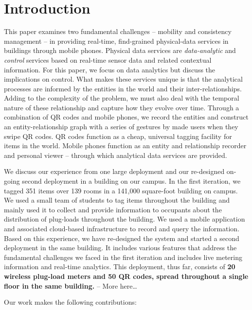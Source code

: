 \section{Introduction}

This paper examines two fundamental challenges -- mobility and consistency management -- in providing real-time, find-grained physical-data 
services in buildings through mobile phones.  Physical data services are \emph{data-analytic} and \emph{control} services 
based on real-time sensor data and related contextual information.  For this paper, we focus on data analytics but discuss the implications
on control.  What makes these services unique is that the analytical processes are informed by the entities in the world and
their inter-relationships.  Adding to the complexity of the problem, we must also deal with the temporal nature of these relationship
and capture how they evolve over time.
Through a combination of QR codes and mobile phones, we record
the entities and construct an entity-relationship graph with a series of gestures by made users when they swipe QR codes.
QR codes function as a cheap, universal tagging facility for items in the world.  Mobile phones function as an entity and relationship recorder and personal viewer -- through which analytical data services are provided.  

We discuss our experience from one large deployment and our re-designed on-going second deployment in a building on our campus.
In the first iteration, we tagged 351 items over 139 rooms in a 141,000 square-foot building on campus.  We used a small team
of students to tag items throughout the building and mainly used it to collect and provide information to occupants
about the distribution of plug-loads throughout the building.  We used a mobile application and associated cloud-based
infrastructure to record and query the information.  Based on this experience, we have re-designed the system and started a
second deployment in the same building.  It includes various features that address the fundamental challenges we faced in the
first iteration and includes live metering information and real-time analytics.  This deployment, thus far, consists of 
{\bf 20 wireless plug-load meters and 50 QR codes, spread throughout a single floor in the same building.} -- More here\dots

Our work makes the following contributions:

